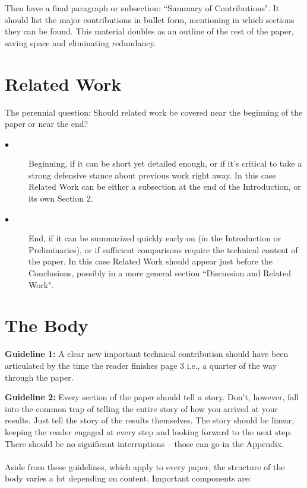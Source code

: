 \documentclass[10pt,twocolumn]{article}
\begin{document}
Then have a final paragraph or subsection: ``Summary of Contributions". It should list the major contributions in bullet form, mentioning in which sections they can be found. This material doubles as an outline of the rest of the paper, saving space and eliminating redundancy.

\section{Related Work}

The perennial question: Should related work be covered near the beginning of the paper or near the end?

\begin{description}
  \item[$\bullet$]  Beginning, if it can be short yet detailed enough, or if it's critical to take a strong defensive stance about previous work right away. In this case Related Work can be either a subsection at the end of the Introduction, or its own Section 2.
  \item[$\bullet$]  End, if it can be summarized quickly early on (in the Introduction or Preliminaries), or if sufficient comparisons require the technical content of the paper. In this case Related Work should appear just before the Conclusions, possibly in a more general section ``Discussion and Related Work".
\end{description}

\section{The Body}

\textbf{Guideline 1:} A clear new important technical contribution should have been articulated by the time the reader finishes page 3 i.e., a quarter of the way through the paper.

\textbf{Guideline 2:} Every section of the paper should tell a story. Don't, however, fall into the common trap of telling the entire story of how you arrived at your results. Just tell the story of the results themselves. The story should be linear, keeping the reader engaged at every step and looking forward to the next step. There should be no significant interruptions -- those can go in the Appendix.
\\
\\
Aside from these guidelines, which apply to every paper, the structure of the body varies a lot depending on content. Important components are:
\end{document}
